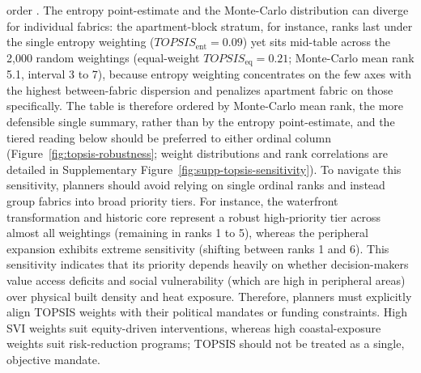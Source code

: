 order \citep{zhang2024MultiObjective, zhu2025SpongeCities}. The entropy point-estimate
and the Monte-Carlo distribution can diverge for individual fabrics: the
apartment-block stratum, for instance, ranks last under the single entropy weighting
($TOPSIS_\text{ent}=0.09$) yet sits mid-table across the 2{,}000 random weightings
(equal-weight $TOPSIS_\text{eq}=0.21$; Monte-Carlo mean rank 5.1, interval 3 to 7),
because entropy weighting concentrates on the few axes with the highest
between-fabric dispersion and penalizes apartment fabric on those specifically. The
table is therefore ordered by Monte-Carlo mean rank, the more defensible single
summary, rather than by the entropy point-estimate, and the tiered reading below
should be preferred to either ordinal column (Figure~\ref{fig:topsis-robustness}; weight distributions and rank correlations are detailed in Supplementary Figure~\ref{fig:supp-topsis-sensitivity}). 
To navigate this sensitivity, planners should avoid relying on single ordinal ranks and instead group fabrics into broad priority tiers. 
For instance, the waterfront transformation and historic core represent a robust high-priority tier across almost all weightings (remaining in ranks 1 to 5), whereas the peripheral expansion exhibits extreme sensitivity (shifting between ranks 1 and 6). 
This sensitivity indicates that its priority depends heavily on whether decision-makers value access deficits and social vulnerability (which are high in peripheral areas) over physical built density and heat exposure. 
Therefore, planners must explicitly align TOPSIS weights with their political mandates or funding constraints. High SVI weights suit equity-driven interventions, whereas high coastal-exposure weights suit risk-reduction programs; TOPSIS should not be treated as a single, objective mandate.

